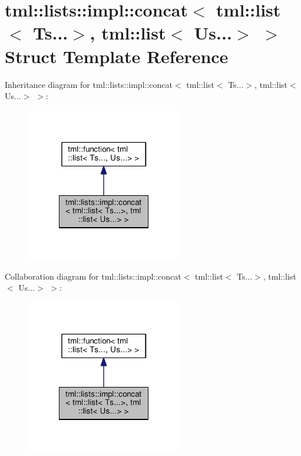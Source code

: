 \hypertarget{structtml_1_1lists_1_1impl_1_1concat_3_01tml_1_1list_3_01_ts_8_8_8_4_00_01tml_1_1list_3_01_us_8_8_8_4_01_4}{\section{tml\+:\+:lists\+:\+:impl\+:\+:concat$<$ tml\+:\+:list$<$ Ts...$>$, tml\+:\+:list$<$ Us...$>$ $>$ Struct Template Reference}
\label{structtml_1_1lists_1_1impl_1_1concat_3_01tml_1_1list_3_01_ts_8_8_8_4_00_01tml_1_1list_3_01_us_8_8_8_4_01_4}
}


Inheritance diagram for tml\+:\+:lists\+:\+:impl\+:\+:concat$<$ tml\+:\+:list$<$ Ts...$>$, tml\+:\+:list$<$ Us...$>$ $>$\+:
\nopagebreak
\begin{figure}[H]
\begin{center}
\leavevmode
\includegraphics[width=192pt]{structtml_1_1lists_1_1impl_1_1concat_3_01tml_1_1list_3_01_ts_8_8_8_4_00_01tml_1_1list_3_01_us_8_8_8_4_01_4__inherit__graph}
\end{center}
\end{figure}


Collaboration diagram for tml\+:\+:lists\+:\+:impl\+:\+:concat$<$ tml\+:\+:list$<$ Ts...$>$, tml\+:\+:list$<$ Us...$>$ $>$\+:
\nopagebreak
\begin{figure}[H]
\begin{center}
\leavevmode
\includegraphics[width=192pt]{structtml_1_1lists_1_1impl_1_1concat_3_01tml_1_1list_3_01_ts_8_8_8_4_00_01tml_1_1list_3_01_us_8_8_8_4_01_4__coll__graph}
\end{center}
\end{figure}
